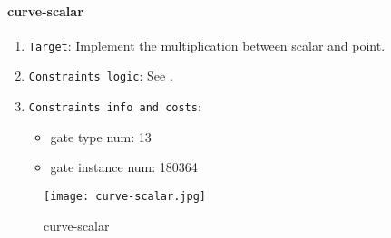 \paragraph{curve-scalar}

\begin{enumerate}
    \item \verb|Target|: Implement the multiplication between scalar and point.
    \item \verb|Constraints logic|: See .
    \item \verb|Constraints info and costs|:
    \begin{itemize}
        \item gate type num: 13 
        \item gate instance num: 180364          
    \end{itemize}
\end{enumerate}

\begin{figure}[!ht]
    \centering
    \texttt{[image: curve-scalar.jpg]}
    \caption{curve-scalar}
    \label{fig:curve-scalar}
\end{figure}
